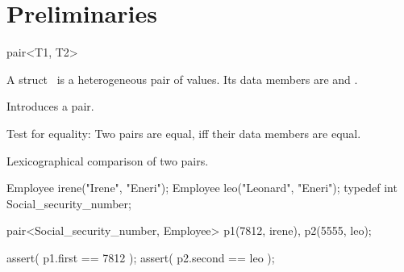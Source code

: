 

\cleardoublepage

\chapter{Preliminaries}



\ccHtmlNoClassLinks
\begin{ccClassTemplate}{pair<T1, T2>}


\ccDefinition

A struct \ccClassName\ is a heterogeneous pair of values. Its data members
are  and .


\ccCreation
{}

             {Introduces a pair.}


\ccOperations

{Test for equality: Two pairs are equal, iff their data members are equal.}


{Lexicographical comparison of two pairs.}


\ccExample

\begin{cprog}
  Employee irene("Irene", "Eneri");
  Employee leo("Leonard", "Eneri");
  typedef int Social_security_number;

  pair<Social_security_number, Employee> p1(7812, irene),  p2(5555, leo);

  assert( p1.first == 7812 );
  assert( p2.second == leo );
  
\end{cprog} 
\end{ccClassTemplate}	
